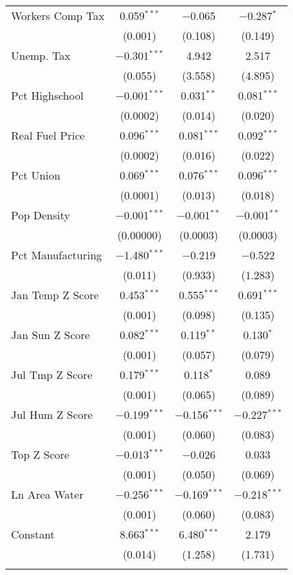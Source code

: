 \begin{table}[!htbp]
\begin{tabular}{@{\extracolsep{5pt}}lccc}
  Workers Comp Tax & 0.059$^{***}$ & $-$0.065 & $-$0.287$^{*}$ \\ 
  & (0.001) & (0.108) & (0.149) \\ 
  Unemp. Tax & $-$0.301$^{***}$ & 4.942 & 2.517 \\ 
  & (0.055) & (3.558) & (4.895) \\ 
  Pct Highschool & $-$0.001$^{***}$ & 0.031$^{**}$ & 0.081$^{***}$ \\ 
  & (0.0002) & (0.014) & (0.020) \\ 
  Real Fuel Price & 0.096$^{***}$ & 0.081$^{***}$ & 0.092$^{***}$ \\ 
  & (0.0002) & (0.016) & (0.022) \\ 
  Pct Union & 0.069$^{***}$ & 0.076$^{***}$ & 0.096$^{***}$ \\ 
  & (0.0001) & (0.013) & (0.018) \\ 
  Pop Density & $-$0.001$^{***}$ & $-$0.001$^{**}$ & $-$0.001$^{**}$ \\ 
  & (0.00000) & (0.0003) & (0.0003) \\ 
  Pct Manufacturing & $-$1.480$^{***}$ & $-$0.219 & $-$0.522 \\ 
  & (0.011) & (0.933) & (1.283) \\ 
  Jan Temp Z Score & 0.453$^{***}$ & 0.555$^{***}$ & 0.691$^{***}$ \\ 
  & (0.001) & (0.098) & (0.135) \\ 
  Jan Sun Z Score & 0.082$^{***}$ & 0.119$^{**}$ & 0.130$^{*}$ \\ 
  & (0.001) & (0.057) & (0.079) \\ 
  Jul Tmp Z Score & 0.179$^{***}$ & 0.118$^{*}$ & 0.089 \\ 
  & (0.001) & (0.065) & (0.089) \\ 
  Jul Hum Z Score & $-$0.199$^{***}$ & $-$0.156$^{***}$ & $-$0.227$^{***}$ \\ 
  & (0.001) & (0.060) & (0.083) \\ 
  Top Z Score & $-$0.013$^{***}$ & $-$0.026 & 0.033 \\ 
  & (0.001) & (0.050) & (0.069) \\ 
  Ln Area Water & $-$0.256$^{***}$ & $-$0.169$^{***}$ & $-$0.218$^{***}$ \\ 
  & (0.001) & (0.060) & (0.083) \\ 
  Constant & 8.663$^{***}$ & 6.480$^{***}$ & 2.179 \\ 
  & (0.014) & (1.258) & (1.731) \\ 
 \hline \\[-1.8ex] 

\end{tabular}
\end{table}
